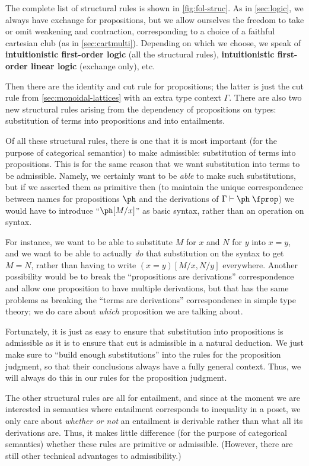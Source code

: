 The complete list of structural rules is shown in \cref{fig:fol-struc}.
As in \cref{sec:logic}, we always have exchange for propositions, but we allow ourselves the freedom to take or omit weakening and contraction, corresponding to a choice of a faithful cartesian club \fS (as in \cref{sec:cartmulti}).
Depending on which we choose, we speak of \textbf{intuitionistic first-order logic} (all the structural rules), \textbf{intuitionistic first-order linear logic} (exchange only), etc.

Then there are the identity and cut rule for propositions; the latter is just the cut rule from \cref{sec:monoidal-lattices} with an extra type context $\Gamma$.
There are also two new structural rules arising from the dependency of propositions on types: substitution of terms into propositions and into entailments.

Of all these structural rules, there is one that it is most important (for the purpose of categorical semantics) to make admissible: substitution of terms into propositions.
This is for the same reason that we want substitution into terms to be admissible.
Namely, we certainly want to be \emph{able} to make such substitutions, but if we asserted them as primitive then (to maintain the unique correspondence between names for propositions $\ph$ and the derivations of $\Gamma\types \ph\prop$) we would have to introduce ``$\ph[M/x]$'' as basic syntax, rather than an operation on syntax.

For instance, we want to be able to substitute $M$ for $x$ and $N$ for $y$ into $x=y$, and we want to be able to actually \emph{do} that substitution on the syntax to get $M=N$, rather than having to write $(x=y)[M/x,N/y]$ everywhere.
Another possibility would be to break the ``propositions are derivations'' correspondence and allow one proposition to have multiple derivations, but that has the same problems as breaking the ``terms are derivations'' correspondence in simple type theory; we do care about \emph{which} proposition we are talking about.

Fortunately, it is just as easy to ensure that substitution into propositions is admissible as it is to ensure that cut is admissible in a natural deduction.
We just make sure to ``build enough substitutions'' into the rules for the proposition judgment, so that their conclusions always have a fully general context.
Thus, we will always do this in our rules for the proposition judgment.

The other structural rules are all for entailment, and since at the moment we are interested in semantics where entailment corresponds to inequality in a poset, we only care about \emph{whether or not} an entailment is derivable rather than what all its derivations are.
Thus, it makes little difference (for the purpose of categorical semantics) whether these rules are primitive or admissible.
(However, there are still other technical advantages to admissibility.)

